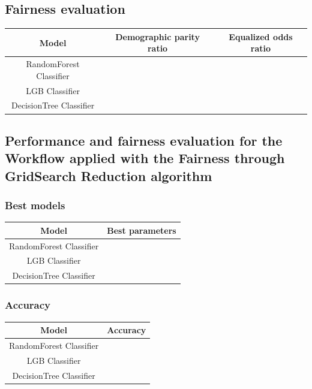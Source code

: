 \documentclass[12pt,a4paper,openright,twoside]{book}
\begin{document}
\subsection{Fairness evaluation}

\begin{tabular}{|c|c|c|}
    \hline
    \textbf{Model} & \textbf{Demographic parity ratio} & \textbf{Equalized odds ratio} \\
    \hline
    RandomForest Classifier & & \\
    \hline
    LGB Classifier & & \\
    \hline
    DecisionTree Classifier & & \\
    \hline
\end{tabular}

\subsection{Performance and fairness evaluation for the Workflow applied with the Fairness through GridSearch Reduction algorithm}

\subsubsection{Best models}

\begin{tabular}{|c|c|}
    \hline
    \textbf{Model} & \textbf{Best parameters} \\
    \hline
    RandomForest Classifier  &  \\
    \hline
    LGB Classifier & \\
    \hline
    DecisionTree Classifier & \\
    \hline
\end{tabular}

\subsubsection{Accuracy}

\begin{tabular}{|c|c|}
    \hline
    \textbf{Model} & \textbf{Accuracy} \\ 
    \hline
    RandomForest Classifier  &  \\
    \hline
    LGB Classifier & \\
    \hline
    DecisionTree Classifier & \\ 
    \hline
\end{tabular}
\end{document}
